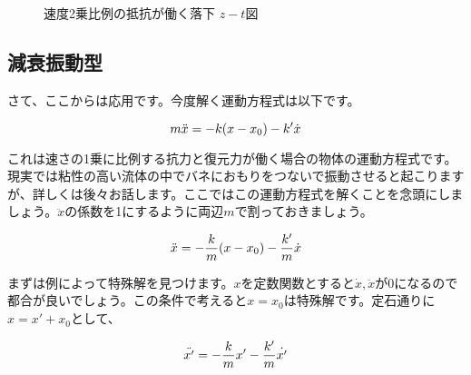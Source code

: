 \begin{figure}[htbp]
\begin{center}
\caption{速度2乗比例の抵抗が働く落下 $z-t$図}
\end{center}
\end{figure}




\subsection{減衰振動型}
\label{vibration+vel_1}
さて、ここからは応用です。今度解く運動方程式は以下です。

\begin{equation}
    m\ddot{x} = -k(x-x_0) - k'\dot{x} \notag
\end{equation}

これは速さの1乗に比例する抗力と復元力が働く場合の物体の運動方程式です。現実では粘性の高い流体の中でバネにおもりをつないで振動させると起こりますが、詳しくは後々お話します。ここではこの運動方程式を解くことを念頭にしましょう。$\ddot{x}$の係数を1にするように両辺$m$で割っておきましょう。

\begin{equation}
    \ddot{x} = -\frac{k}{m}(x-x_0) - \frac{k'}{m}\dot{x} \notag
\end{equation}

まずは例によって特殊解を見つけます。$x$を定数関数とすると$\dot{x},\ddot{x}$が$0$になるので都合が良いでしょう。この条件で考えると$x=x_0$は特殊解です。定石通りに$x=x'+x_0$として、

\begin{equation}
    \ddot{x'} = -\frac{k}{m}x' - \frac{k'}{m}\dot{x'} \notag
\end{equation}

